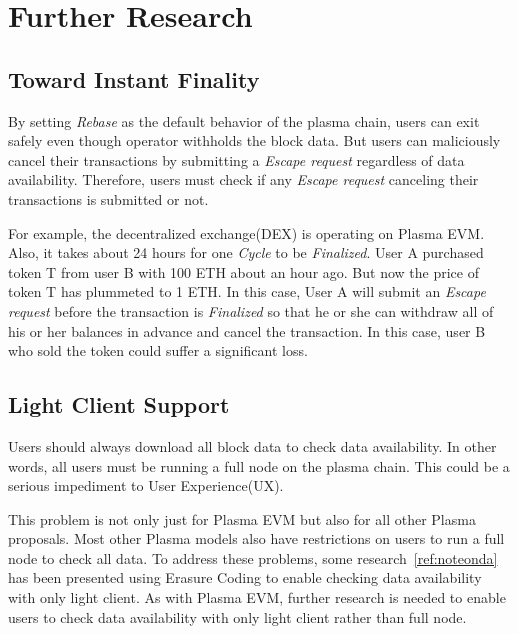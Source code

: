 \documentclass[letterpaper, 11pt]{article}
\begin{document}
\section{Further Research}
\subsection{Toward Instant Finality}
\begin{CJK}{UTF8}{mj}
By setting \emph{Rebase} as the default behavior of the plasma chain, users can exit safely even though operator withholds the block data. But users can maliciously cancel their transactions by submitting a \emph{Escape request} regardless of data availability. Therefore, users must check if any \emph{Escape request} canceling their transactions is submitted or not.

For example, the decentralized exchange(DEX) is operating on Plasma EVM. Also, it takes about 24 hours for one \emph{Cycle} to be \emph{Finalized}. User A purchased token T from user B with 100 ETH about an hour ago. But now the price of token T has plummeted to 1 ETH. In this case, User A will submit an \emph{Escape request} before the transaction is \emph{Finalized} so that he or she can withdraw all of his or her balances in advance and cancel the transaction. In this case, user B who sold the token could suffer a significant loss.
\end{CJK}

\subsection{Light Client Support}
\begin{CJK}{UTF8}{mj}
Users should always download all block data to check data availability. In other words, all users must be running a full node on the plasma chain. This could be a serious impediment to User Experience(UX).

This problem is not only just for Plasma EVM but also for all other Plasma proposals. Most other Plasma models also have restrictions on users to run a full node to check all data. To address these problems, some research~\ref{ref:noteonda} has been presented using Erasure Coding to enable checking data availability with only light client. As with Plasma EVM, further research is needed to enable users to check data availability with only light client rather than full node.
\end{CJK}
\end{document}
